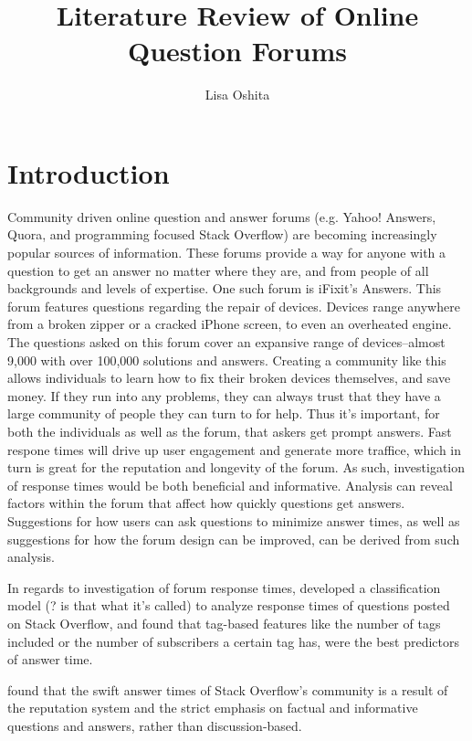 \documentclass[12pt]{article}
\title{Literature Review of Online Question Forums}
\author{Lisa Oshita}
\date{}
\begin{document}
\maketitle

\section{Introduction}

    Community driven online question and answer forums (e.g. Yahoo! Answers, Quora, and programming focused Stack Overflow) are becoming increasingly popular sources of information. These forums provide a way for anyone with a question to get an answer no matter where they are, and from people of all backgrounds and levels of expertise. One such forum is iFixit's Answers. This forum features questions regarding the repair of devices. Devices range anywhere from a broken zipper or a cracked iPhone screen, to even an overheated engine. The questions asked on this forum cover an expansive range of devices--almost 9,000 with over 100,000 solutions and answers. Creating a community like this allows individuals to learn how to fix their broken devices themselves, and save money. If they run into any problems, they can always trust that they have a large community of people they can turn to for help. Thus it's important, for both the individuals as well as the forum, that askers get prompt answers. Fast respone times will drive up user engagement and generate more traffice, which in turn is great for the reputation and longevity of the forum. As such, investigation of response times would be both beneficial and informative. Analysis can reveal factors within the forum that affect how quickly questions get answers. Suggestions for how users can ask questions to minimize answer times, as well as suggestions for how the forum design can be improved, can be derived from such analysis. 

    In regards to investigation of forum response times, \citep{Bhat2014} developed a classification model (? is that what it's called) to analyze response times of questions posted on Stack Overflow, and found that tag-based features like the number of tags included or the number of subscribers a certain tag has, were the best predictors of answer time. 

    \citep{Mamykina2011} found that the swift answer times of Stack Overflow's community is a result of the reputation system and the strict emphasis on factual and informative questions and answers, rather than discussion-based. 
\end{document}
